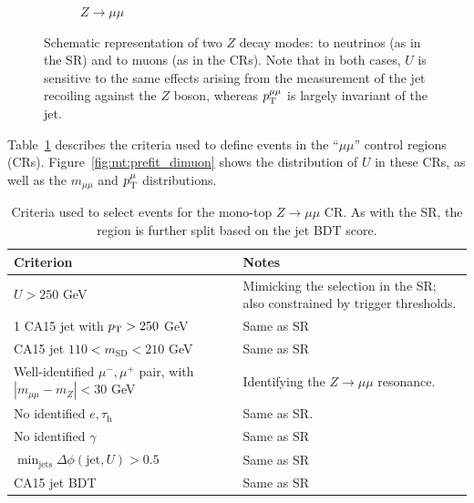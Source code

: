 \begin{figure}[]
\begin{center}
\begin{subfigure}[t]{0.49\textwidth}
            \caption{$Z\rightarrow\mu\mu$}
        \end{subfigure}
        \caption{Schematic representation of two $Z$ decay modes: to neutrinos (as in the SR) and to muons (as in the CRs).
                 Note that in both cases, $U$ is sensitive to the same effects arising from the measurement of the jet recoiling against the $Z$ boson, whereas $p_\mathrm{T}^{\mu\mu}$ is largely invariant of the jet.}
        \label{fig:mt:zvsz}
    \end{center}
\end{figure}

Table~\ref{tab:mt:zmm_cuts} describes the criteria used to define events in the ``$\mu\mu$'' control regions (CRs). 
Figure~\ref{fig:mt:prefit_dimuon} shows the distribution of $U$ in these CRs, as well as the $m_{\mu\mu}$ and $p_\mathrm{T}^\mu$ distributions. 

\begin{table}[]
    \caption{Criteria used to select events for the mono-top $Z\rightarrow\mu\mu$ CR. As with the SR, the region is further split based on the jet BDT score.}
    \label{tab:mt:zmm_cuts}
    \centering
    \begin{tabular}{p{}p{}}
        Criterion & Notes \\ 
        \hline 
        \hline 
        $U>250$ GeV & Mimicking the selection in the SR; also constrained by trigger thresholds. \\ 
        1 CA15 jet with $p_\mathrm{T}>250$ GeV &  Same as SR \\ 
        CA15 jet $110 < m_\mathrm{SD} < 210$ GeV & Same as SR \\ 
        \hline 
        Well-identified $\mu^-,\mu^+$ pair, with $|m_{\mu\mu}-m_Z|<30$ GeV & Identifying the $Z\rightarrow\mu\mu$ resonance. \\ 
        No identified $e,\tau_\mathrm{h}$ & Same as SR. \\ 
        No identified $\gamma$ & Same as SR \\ 
        \hline 
        $\min_\mathrm{jets}\Delta\phi(\mathrm{jet},U) > 0.5$ & Same as SR \\ 
        \hline 
        CA15 jet BDT & Same as SR\\ 
    \end{tabular}
\end{table}

